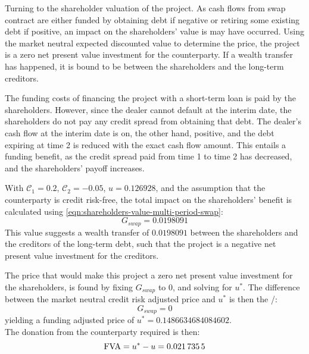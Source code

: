 \documentclass[main.tex]{subfiles}
\begin{document}
            Turning to the shareholder valuation of the project.
            As cash flows from swap contract are either funded by obtaining debt if negative or retiring some existing debt if positive,
            an impact on the shareholders' value is may have occurred.
            Using the market neutral expected discounted value to determine the price, the project is a zero net present value investment for the counterparty.
            If a wealth transfer has happened, it is bound to be between the shareholders and the long-term creditors.

            The funding costs of financing the project with a short-term loan is paid by the shareholders.
            However, since the dealer cannot default at the interim date,
            the shareholders do not pay any credit spread from obtaining that debt.
            The dealer's cash flow at the interim date is on, the other hand, positive,
            and the debt expiring at time 2 is reduced with the exact cash flow amount.
            This entails a funding benefit, as the credit spread paid from time 1 to time 2 has decreased,
            and the shareholders' payoff increases.
            
            With $\mathcal{C}_1=\num{0.2}$,
            $\mathcal{C}_2=\num{-0.05}$,
            $u=\num{0.126928}$,
            and the assumption that the counterparty is credit risk-free,
            the total impact on the shareholders' benefit is calculated using \cref{eqn:shareholders-value-multi-period-swap}:
            \begin{equation}
                G_{swap} = \num{0.0198091}
            \end{equation}
            This value suggests a wealth transfer of $\num{0.0198091}$
            between the shareholders and the creditors of the long-term debt,
            such that the project is a negative net present value investment for the creditors.

            The price that would make this project a zero net present value investment for the shareholders,
            is found by fixing $G_{swap}$ to 0,
            and solving for $u^{\ast}$.
            The difference between the market neutral credit risk adjusted price and $u^{\ast}$ is then the \FVA/:
            \begin{equation}
                G_{swap} = 0
            \end{equation}
            yielding a funding adjusted price of $u^{\ast} = \num{0.1486634684084602}$.
            \\
            The donation from the counterparty required is then:
            \begin{equation}
                \FVA/ = u^{\ast} - u = \num{0.0217355}
            \end{equation}
\end{document}
